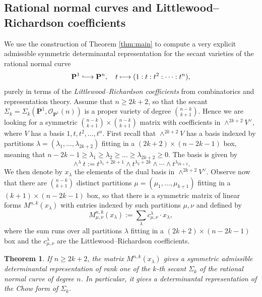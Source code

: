 \documentclass[12pt]{amsart}
\newtheorem{introthm}{Theorem}
\numberwithin{equation}{section}
\numberwithin{thmcounter}{section}
\theoremstyle{definition}
\theoremstyle{claim}
\newcommand{\nP}{\mathbf{P}}
\newcommand{\sO}{\mathscr{O}}
\newcommand*{\longhookrightarrow}{\ensuremath{\lhook\joinrel\relbar\joinrel\rightarrow}}
\begin{document}
\subsection{Rational normal curves and Littlewood--Richardson coefficients}
We use the construction of Theorem \ref{thm:main} to compute a very explicit admissible symmetric determinantal representation for the secant varieties of the rational normal curve 
\[ \nP^1 \longhookrightarrow \nP^n, \quad t\longmapsto (1:t:t^2:\cdots:t^n), \]
purely in terms of the \emph{Littlewood--Richardson coefficients} from combinatorics and representation theory. Assume that $n\geq 2k+2$, so that the secant $\Sigma_k=\Sigma_k(\nP^1,\sO_{\nP^1}(n))$ is  a proper variety of degree $\binom{n-k}{k+1}$. Hence we are looking for a symmetric $\binom{n-k}{k+1}\times \binom{n-k}{k+1}$  matrix with coefficients in $\wedge^{2k+2}V^{\vee}$, where $V$ has a basis $1,t,t^2,\ldots,t^{n}$. First recall that $\wedge^{2k+2}V$ has a basis indexed by partitions $\lambda = (\lambda_1,\ldots,\lambda_{2k+2})$  fitting in a $(2k+2)\times (n-2k-1)$ box, meaning that $n-2k-1 \geq \lambda_1 \geq \lambda_2 \geq \ldots \geq \lambda_{2k+2} \geq 0$. The basis is given by
\[ \wedge^{\lambda} t := t^{\lambda_1+2k+1} \wedge t^{\lambda_2+2k} \wedge \cdots \wedge t^{\lambda_{2k+2}}. \]
We then denote by $x_{\lambda}$ the elements of the dual basis in $\wedge^{2k+2}V^{\vee}$. Observe now that there are $\binom{n-k}{k+1}$ distinct partitions $\mu = (\mu_1,\ldots,\mu_{k+1})$ fitting in a $(k+1)\times (n-2k-1)$ box, so that there is a symmetric matrix of linear forms $M^{n,k}(x_{\lambda})$ with entries indexed by such partitions $\mu,\nu$ and defined by
\[ M^{n,k}_{\mu,\nu}(x_{\lambda}) := \sum_{\lambda} c^{\lambda}_{\mu,\nu}\cdot x_{\lambda}, \]
where the sum runs over all partitions $\lambda$ fitting in a $(2k+2)\times (n-2k-1)$ box and the $c^{\lambda}_{\mu,\nu}$ are the Littlewood--Richardson coefficients.

\begin{introthm}\label{thm:rat_norm}
	If $n\geq 2k+2$, the matrix $M^{n,k}(x_{\lambda})$ gives a symmetric admissible determinantal representation of rank one of the $k$-th secant $\Sigma_k$ of the rational normal curve of degree $n$. In particular, it gives a determinantal representation of the Chow form of $\Sigma_k$.
\end{introthm}
\end{document}
